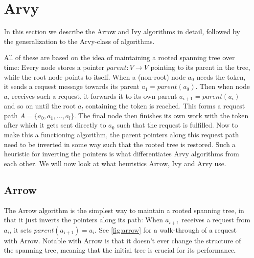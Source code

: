 \documentclass[a4paper, oneside]{discothesis}
\begin{document}
\newpage
\section{Arvy}

In this section we describe the Arrow and Ivy algorithms in detail, followed by the generalization to the Arvy-class of algorithms.

All of these are based on the idea of maintaining a rooted spanning tree over time: Every node stores a pointer $parent : V \rightarrow V$ pointing to its parent in the tree, while the root node points to itself. When a (non-root) node $a_{0}$ needs the token, it sends a request message towards its parent $a_{1}=parent(a_{0})$. Then when node $a_{i}$ receives such a request, it forwards it to its own parent $a_{i+1}=parent(a_{i})$ and so on until the root $a_{l}$ containing the token is reached. This forms a request path $A=\{a_{0},a_{1},\dots,a_{l}\}$. The final node then finishes its own work with the token after which it gets sent directly to $a_{0}$ such that the request is fulfilled. Now to make this a functioning algorithm, the parent pointers along this request path need to be inverted in some way such that the rooted tree is restored. Such a heuristic for inverting the pointers is what differentiates Arvy algorithms from each other. We will now look at what heuristics Arrow, Ivy and Arvy use.

\subsection{Arrow}
\label{intro:arrow}

The Arrow algorithm is the simplest way to maintain a rooted spanning tree, in that it just inverts the pointers along its path: When $a_{i+1}$ receives a request from $a_{i}$, it sets $parent(a_{i+1})=a_{i}$. See \autoref{fig:arrow} for a walk-through of a request with Arrow. Notable with Arrow is that it doesn't ever change the structure of the spanning tree, meaning that the initial tree is crucial for its performance.
\end{document}
